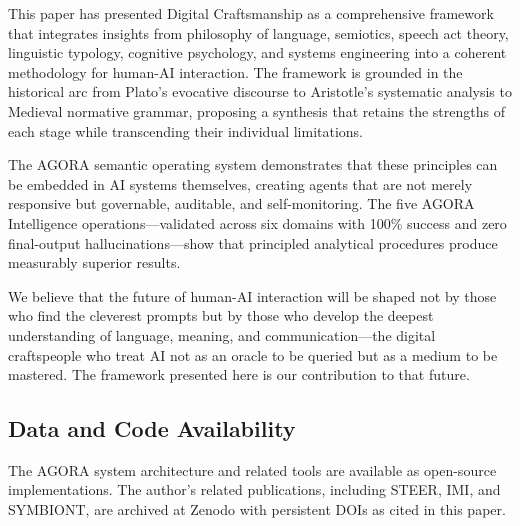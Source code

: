 \documentclass[11pt,a4paper]{article}
\begin{document}
This paper has presented Digital Craftsmanship as a comprehensive framework that integrates insights from philosophy of language, semiotics, speech act theory, linguistic typology, cognitive psychology, and systems engineering into a coherent methodology for human-AI interaction. The framework is grounded in the historical arc from Plato's evocative discourse to Aristotle's systematic analysis to Medieval normative grammar, proposing a synthesis that retains the strengths of each stage while transcending their individual limitations.

The AGORA semantic operating system demonstrates that these principles can be embedded in AI systems themselves, creating agents that are not merely responsive but governable, auditable, and self-monitoring. The five AGORA Intelligence operations---validated across six domains with 100\% success and zero final-output hallucinations---show that principled analytical procedures produce measurably superior results.

We believe that the future of human-AI interaction will be shaped not by those who find the cleverest prompts but by those who develop the deepest understanding of language, meaning, and communication---the digital craftspeople who treat AI not as an oracle to be queried but as a medium to be mastered. The framework presented here is our contribution to that future.

\subsection*{Data and Code Availability}

The AGORA system architecture and related tools are available as open-source implementations. The author's related publications, including STEER, IMI, and SYMBIONT, are archived at Zenodo with persistent DOIs as cited in this paper.


\end{document}
